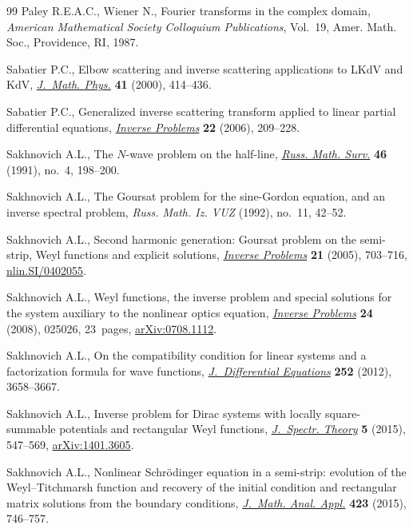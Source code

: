\documentclass[pdftex]{sigma}
\numberwithin{equation}{section}
\begin{document}
\begin{thebibliography}{99}
Paley R.E.A.C., Wiener N., Fourier transforms in the complex domain,
 \textit{American Mathematical Society Colloquium Publications}, Vol.~19,
 Amer. Math. Soc., Providence, RI, 1987.

Sabatier P.C., Elbow scattering and inverse scattering applications to {LK}d{V}
 and {K}d{V}, \href{http://dx.doi.org/10.1063/1.533138}{\textit{J.~Math. Phys.}} \textbf{41} (2000), 414--436.

Sabatier P.C., Generalized inverse scattering transform applied to linear
 partial dif\/ferential equations, \href{http://dx.doi.org/10.1088/0266-5611/22/1/012}{\textit{Inverse Problems}} \textbf{22} (2006),
 209--228.

Sakhnovich A.L., The {$N$}-wave problem on the half-line, \href{http://dx.doi.org/10.1070/RM1991v046n04ABEH002834}{\textit{Russ. Math.
 Surv.}} \textbf{46} (1991), no.~4, 198--200.

Sakhnovich A.L., The {G}oursat problem for the sine-{G}ordon equation, and an
 inverse spectral problem, \textit{Russ. Math. Iz. VUZ} (1992), no.~11,
 42--52.

Sakhnovich A.L., Second harmonic generation: {G}oursat problem on the
 semi-strip, {W}eyl functions and explicit solutions, \href{http://dx.doi.org/10.1088/0266-5611/21/2/016}{\textit{Inverse
 Problems}} \textbf{21} (2005), 703--716, \href{http://arxiv.org/abs/nlin.SI/0402055}{nlin.SI/0402055}.

Sakhnovich A.L., Weyl functions, the inverse problem and special solutions for
 the system auxiliary to the nonlinear optics equation, \href{http://dx.doi.org/10.1088/0266-5611/24/2/025026}{\textit{Inverse
 Problems}} \textbf{24} (2008), 025026, 23~pages, \href{http://arxiv.org/abs/0708.1112}{arXiv:0708.1112}.

Sakhnovich A.L., On the compatibility condition for linear systems and a
 factorization formula for wave functions, \href{http://dx.doi.org/10.1016/j.jde.2011.11.001}{\textit{J.~Differential Equations}}
 \textbf{252} (2012), 3658--3667.

Sakhnovich A.L., Inverse problem for {D}irac systems with locally
 square-summable potentials and rectangular {W}eyl functions,
 \href{http://dx.doi.org/10.4171/JST/106}{\textit{J.~Spectr. Theory}} \textbf{5} (2015), 547--569, \href{http://arxiv.org/abs/1401.3605}{arXiv:1401.3605}.

Sakhnovich A.L., Nonlinear {S}chr\"odinger equation in a semi-strip: evolution
 of the {W}eyl--{T}itchmarsh function and recovery of the initial condition
 and rectangular matrix solutions from the boundary conditions,
 \href{http://dx.doi.org/10.1016/j.jmaa.2014.10.012}{\textit{J.~Math. Anal. Appl.}} \textbf{423} (2015), 746--757.


\end{thebibliography}
\end{document}
